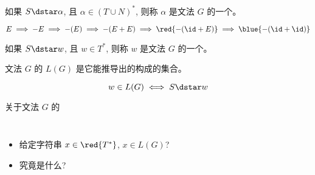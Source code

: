 \begin{frame}{}
  \begin{definition}
    如果 $S \dstar \alpha$, 且 $\alpha \in (T \cup N)^{\ast}$,
    则称 $\alpha$ 是文法 $G$ 的一个。
  \end{definition}

  \vspace{0.30cm}
  

  \vspace{-0.80cm}
  \[
    E \implies -E \implies -(E) \implies -(E + E)
      \implies \red{-(\id + E)} \implies \blue{-(\id + \id)}
  \]

  \pause
  \begin{definition}[Sentence; 句子]
    如果 $S \dstar w$, 且 $w \in T^{\ast}$,
    则称 $w$ 是文法 $G$ 的一个。
  \end{definition}
\end{frame}

\begin{frame}{}
  \begin{definition}[文法$G$生成的语言 $L(G)$]
    文法 $G$ 的 $L(G)$ 是它能推导出的构成的集合。

    \[
      w \in L(G) \iff S \dstar w
    \]
  \end{definition}
\end{frame}

\begin{frame}{}
  \begin{center}
    关于文法 $G$ 的
  \end{center}

  \vspace{0.60cm}
  \begin{columns}
      \begin{itemize}
        \setlength{\itemsep}{15pt}
        \item {}
          给定字符串 $x \in \red{T^{\ast}}$, $x \in L(G)$?
        \item {} 究竟是什么?
      \end{itemize}
  \end{columns}
\end{frame}

